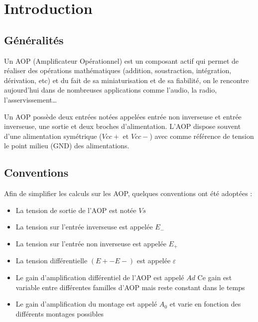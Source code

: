 
 \chapter{Introduction }
 
 \section{Généralités}

  
Un AOP (Amplificateur Opérationnel) est un composant actif qui permet de réaliser des opérations mathématiques (addition, soustraction, intégration, dérivation, etc) et du fait de sa miniaturisation et de sa fiabilité, on le rencontre aujourd’hui dans de nombreuses applications comme l’audio, la radio, l’asservissement…


Un AOP possède deux entrées notées appelées {\color{red}entrée non inverseuse} et {\color{red}entrée inverseuse}, une {\color{red}sortie} et deux broches d’{\color{red}alimentation}.
L’AOP dispose souvent d’une alimentation symétrique ($Vcc+$ et $Vcc-$) avec comme référence de tension le point milieu (GND) des alimentations.



\section{Conventions}


Afin de simplifier les calculs sur les AOP, quelques conventions ont été adoptées :

\begin{itemize}
  \item La tension de sortie de l’AOP est notée $Vs$
  \item La tension sur l’entrée inverseuse est appelée $E_-$
  \item La tension sur l’entrée non inverseuse est appelée $E_+$
  \item La tension différentielle {\color{red}$(E+-E-)$ est appelée $\varepsilon$}
  \item Le gain d’amplification différentiel de l’AOP est appelé $Ad$
  Ce gain est variable entre différentes familles d’AOP mais reste constant dans le temps
  \item Le gain d’amplification du montage est appelé $A_0$ et varie en fonction des différents montages possibles 
\end{itemize}

